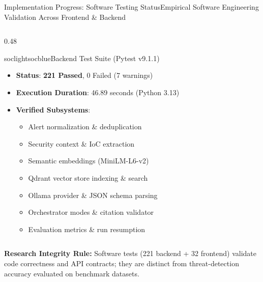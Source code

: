 \documentclass[aspectratio=169, 10pt]{beamer}
\begin{document}
\begin{frame}{Implementation Progress: Software Testing Status}{Empirical Software Engineering Validation Across Frontend \& Backend}
\begin{columns}[T]
    \begin{column}{0.48\textwidth}
      \begin{cardbox}{soclight}{socblue}{Backend Test Suite (Pytest v9.1.1)}
        \begin{itemize}\setlength{\itemsep}{1.5pt}
          \item \textbf{Status}: \textcolor{socgreen}{\textbf{221 Passed}}, 0 Failed (7 warnings)
          \item \textbf{Execution Duration}: 46.89 seconds (Python 3.13)
          \item \textbf{Verified Subsystems}:
            \begin{itemize}\tiny
              \item Alert normalization \& deduplication
              \item Security context \& IoC extraction
              \item Semantic embeddings (MiniLM-L6-v2)
              \item Qdrant vector store indexing \& search
              \item Ollama provider \& JSON schema parsing
              \item Orchestrator modes \& citation validator
              \item Evaluation metrics \& run resumption
            \end{itemize}
        \end{itemize}
      \end{cardbox}
    \end{column}
  \end{columns}

  \vspace{0.12cm}
  \begin{tcolorbox}[colback=socnavy!5,colframe=socnavy,boxrule=0.5pt,arc=1mm,top=2.5pt,bottom=2.5pt,left=6pt,right=6pt]
    \scriptsize\textbf{Research Integrity Rule:} Software tests (221 backend + 32 frontend) validate code correctness and API contracts; they are distinct from threat-detection accuracy evaluated on benchmark datasets.
  \end{tcolorbox}
\end{frame}
\end{document}
